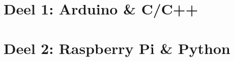 \documentclass[11pt,fleqn]{book} %
\begin{document}


\pagestyle{empty} %

\renewcommand{\contentsname}{Inhoudsopgave}
\tableofcontents %

\cleardoublepage %

\pagestyle{fancy} %


\part{Deel 1: Arduino \& C/C++}


%
%


\part{Deel 2: Raspberry Pi \& Python}









\end{document}
